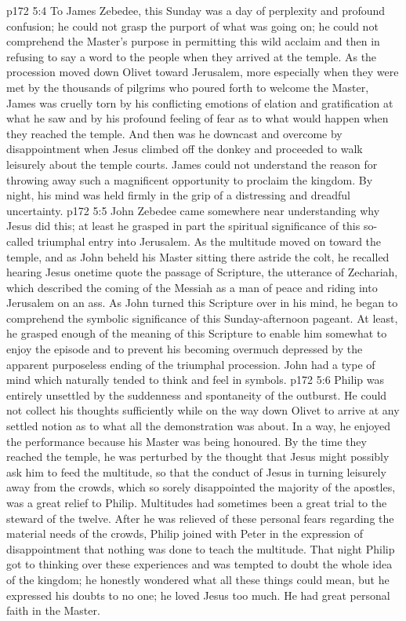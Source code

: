 \vs p172 5:4 To James Zebedee, this Sunday was a day of perplexity and profound confusion; he could not grasp the purport of what was going on; he could not comprehend the Master’s purpose in permitting this wild acclaim and then in refusing to say a word to the people when they arrived at the temple. As the procession moved down Olivet toward Jerusalem, more especially when they were met by the thousands of pilgrims who poured forth to welcome the Master, James was cruelly torn by his conflicting emotions of elation and gratification at what he saw and by his profound feeling of fear as to what would happen when they reached the temple. And then was he downcast and overcome by disappointment when Jesus climbed off the donkey and proceeded to walk leisurely about the temple courts. James could not understand the reason for throwing away such a magnificent opportunity to proclaim the kingdom. By night, his mind was held firmly in the grip of a distressing and dreadful uncertainty.
\vs p172 5:5 John Zebedee came somewhere near understanding why Jesus did this; at least he grasped in part the spiritual significance of this so\hyp{}called triumphal entry into Jerusalem. As the multitude moved on toward the temple, and as John beheld his Master sitting there astride the colt, he recalled hearing Jesus onetime quote the passage of Scripture, the utterance of Zechariah, which described the coming of the Messiah as a man of peace and riding into Jerusalem on an ass. As John turned this Scripture over in his mind, he began to comprehend the symbolic significance of this Sunday\hyp{}afternoon pageant. At least, he grasped enough of the meaning of this Scripture to enable him somewhat to enjoy the episode and to prevent his becoming overmuch depressed by the apparent purposeless ending of the triumphal procession. John had a type of mind which naturally tended to think and feel in symbols.
\vs p172 5:6 \pc Philip was entirely unsettled by the suddenness and spontaneity of the outburst. He could not collect his thoughts sufficiently while on the way down Olivet to arrive at any settled notion as to what all the demonstration was about. In a way, he enjoyed the performance because his Master was being honoured. By the time they reached the temple, he was perturbed by the thought that Jesus might possibly ask him to feed the multitude, so that the conduct of Jesus in turning leisurely away from the crowds, which so sorely disappointed the majority of the apostles, was a great relief to Philip. Multitudes had sometimes been a great trial to the steward of the twelve. After he was relieved of these personal fears regarding the material needs of the crowds, Philip joined with Peter in the expression of disappointment that nothing was done to teach the multitude. That night Philip got to thinking over these experiences and was tempted to doubt the whole idea of the kingdom; he honestly wondered what all these things could mean, but he expressed his doubts to no one; he loved Jesus too much. He had great personal faith in the Master.
